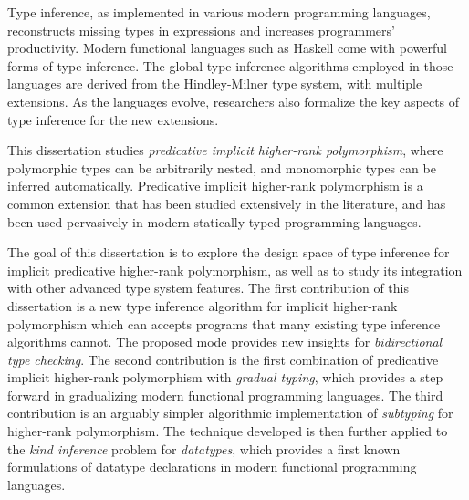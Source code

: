 %
\noindent

Type inference, as implemented in various modern programming languages,
reconstructs missing types in expressions and increases programmers'
productivity. Modern functional languages such as Haskell come with powerful
forms of type inference. The global type-inference algorithms employed in those
languages are derived from the Hindley-Milner type system, with multiple
extensions. As the languages evolve, researchers also formalize the key aspects
of type inference for the new extensions.

This dissertation studies \textit{predicative implicit higher-rank
  polymorphism}, where polymorphic types can be arbitrarily nested, and
monomorphic types can be inferred automatically. Predicative implicit
higher-rank polymorphism is a common extension that has been studied extensively
in the literature, and has been used pervasively in modern statically typed
programming languages.

The goal of this dissertation is to explore the design space of type inference
for implicit predicative higher-rank polymorphism, as well as to study its
integration with other advanced type system features. The first contribution of
this dissertation is a new type inference algorithm for implicit higher-rank
polymorphism which can accepts programs that many existing type inference
algorithms cannot. The proposed \textit{\mode} mode provides new insights for
\textit{bidirectional type checking}. The second contribution is the first
combination of predicative implicit higher-rank polymorphism with
\textit{gradual typing}, which provides a step forward in gradualizing modern
functional programming languages. The third contribution is an arguably simpler
algorithmic implementation of \textit{subtyping} for higher-rank polymorphism.
The technique developed is then further applied to the \textit{kind inference}
problem for \textit{datatypes}, which provides a first known formulations of
datatype declarations in modern functional programming languages.








